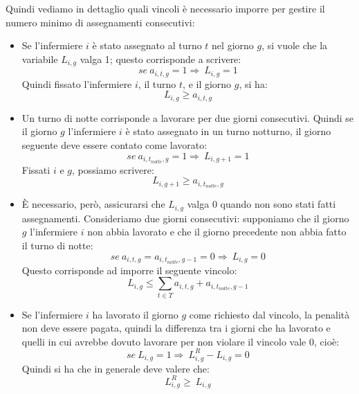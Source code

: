 Quindi vediamo in dettaglio quali vincoli è necessario imporre per gestire il numero minimo di assegnamenti consecutivi:
\begin{itemize}

\item Se l'infermiere $i$ è stato assegnato al turno $t$ nel giorno $g$, si vuole che la variabile $L_{i, g}$ valga 1; questo corrisponde a scrivere:
\begin{equation}
se ~ a_{i, t, g} = 1 \Longrightarrow\ L_{i, g} = 1
\end{equation}
Quindi fissato l'infermiere $i$, il turno $t$, e il giorno $g$, si ha:
\begin{equation}
L_{i, g} \geq a_{i, t, g}
\end{equation}

\item Un turno di notte corrisponde a lavorare per due giorni consecutivi.
Quindi se il giorno $g$ l'infermiere $i$ è stato assegnato in un turno notturno, il giorno seguente deve essere contato come lavorato:\\
\begin{equation}
se ~ a_{i, t_{notte}, g} = 1 \Longrightarrow\ L_{i, g+1} = 1
\end{equation}
Fissati $i$ e $g$, possiamo scrivere:
\begin{equation}
L_{i, g+1} \geq a_{i, t_{notte}, g}
\end{equation}

\item È necessario, però, assicurarsi che $L_{i, g}$ valga 0 quando non sono stati fatti assegnamenti. Consideriamo due giorni consecutivi: supponiamo che il giorno $g$ l'infermiere $i$ non abbia lavorato e che il giorno precedente non abbia fatto il turno di notte:
\begin{equation}
se ~ a_{i, t, g} = a_{i, t_{notte}, g-1} = 0 \Longrightarrow\ L_{i, g} = 0
\end{equation}
Questo corrisponde ad imporre il seguente vincolo:
\begin{equation}
L_{i, g} \leq \sum_{t \in T} a_{i, t, g} + a_{i, t_{notte}, g-1}
\end{equation}

\item Se l'infermiere $i$ ha lavorato il giorno $g$ come richiesto dal vincolo, la penalità non deve essere pagata, quindi la differenza tra i giorni che ha lavorato e quelli in cui avrebbe dovuto lavorare per non violare il vincolo vale 0, cioè:
\begin{equation}
se ~ L_{i, g} = 1 \Longrightarrow\ L_{i, g}^R - L_{i, g} = 0
\end{equation}
Quindi si ha che in generale deve valere che:
\begin{equation}
L_{i, g}^R \geq ~ L_{i, g}
\end{equation}


\end{itemize}

